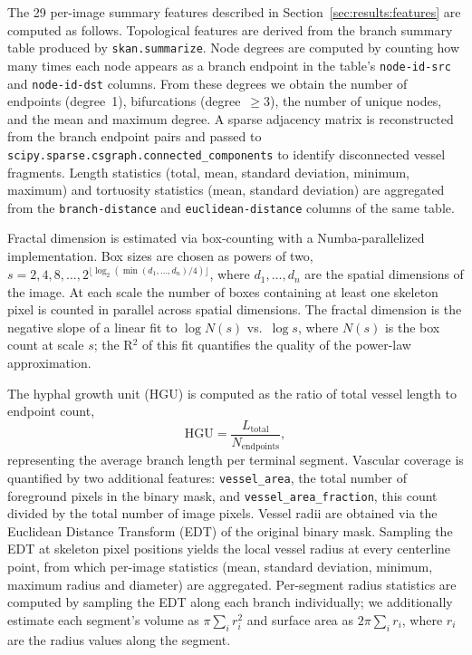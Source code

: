 \documentclass[11pt]{article}
\begin{document}
The 29 per-image summary features described in
Section~\ref{sec:results:features} are computed as follows.
Topological features are derived from the branch summary table
produced by \texttt{skan.summarize}. Node degrees are computed by
counting how many times each node appears as a branch endpoint in the
table's \texttt{node-id-src} and \texttt{node-id-dst} columns. From
these degrees we obtain the number of endpoints (degree~1),
bifurcations (degree~$\ge$3), the number of unique nodes, and the
mean and maximum degree. A sparse adjacency matrix is reconstructed
from the branch endpoint pairs and passed to
\texttt{scipy.sparse.csgraph.connected\_components} to identify
disconnected vessel fragments. Length statistics (total, mean,
standard deviation, minimum, maximum) and tortuosity statistics (mean,
standard deviation) are aggregated from the \texttt{branch-distance}
and \texttt{euclidean-distance} columns of the same table.

Fractal dimension is estimated via box-counting with a
Numba-parallelized implementation. Box sizes are chosen as powers of
two, $s = 2, 4, 8, \dots, 2^{\lfloor \log_2(\min(d_1,\dots,d_n)/4)
\rfloor}$, where $d_1,\dots,d_n$ are the spatial dimensions of the
image. At each scale the number of boxes containing at least one
skeleton pixel is counted in parallel across spatial dimensions. The
fractal dimension is the negative slope of a linear fit to $\log N(s)$
vs.\ $\log s$, where $N(s)$ is the box count at scale $s$; the R$^2$
of this fit quantifies the quality of the power-law approximation.

The hyphal growth unit (HGU) is computed as the ratio of total vessel
length to endpoint count,
\[
  \mathrm{HGU} = \frac{L_\text{total}}{N_\text{endpoints}},
\]
representing the average branch length per terminal segment. Vascular
coverage is quantified by two additional features: \texttt{vessel\_area},
the total number of foreground pixels in the binary mask, and
\texttt{vessel\_area\_fraction}, this count divided by the total number
of image pixels. Vessel radii are obtained via the Euclidean Distance
Transform (EDT) of the original binary mask. Sampling the EDT at
skeleton pixel positions
yields the local vessel radius at every centerline point, from which
per-image statistics (mean, standard deviation, minimum, maximum radius
and diameter) are aggregated. Per-segment radius statistics are
computed by sampling the EDT along each branch individually; we
additionally estimate each segment's volume as $\pi \sum_i r_i^2$ and
surface area as $2\pi \sum_i r_i$, where $r_i$ are the radius values
along the segment.
\end{document}
